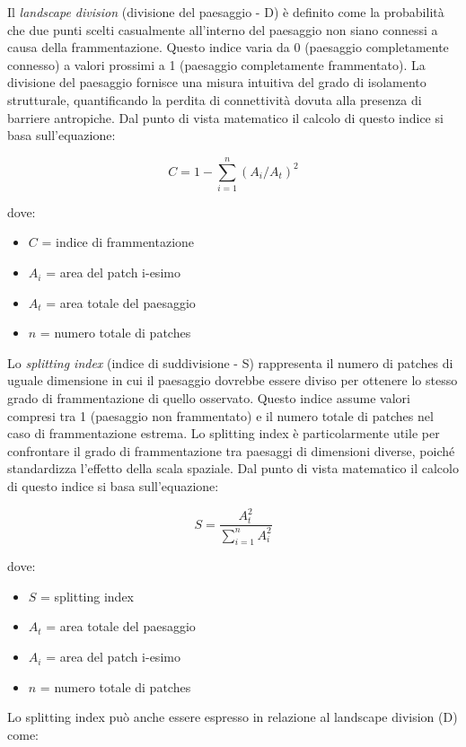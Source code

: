 \documentclass[
  a4paper,
]{book}
\providecommand{\tightlist}{%
  \setlength{\itemsep}{0pt}\setlength{\parskip}{0pt}}
\begin{document}
Il \emph{landscape division} (divisione del paesaggio - D) è definito come la probabilità che due punti scelti casualmente all'interno del paesaggio non siano connessi a causa della frammentazione.
Questo indice varia da 0 (paesaggio completamente connesso) a valori prossimi a 1 (paesaggio completamente frammentato).
La divisione del paesaggio fornisce una misura intuitiva del grado di isolamento strutturale, quantificando la perdita di connettività dovuta alla presenza di barriere antropiche.
Dal punto di vista matematico il calcolo di questo indice si basa sull'equazione:

\[C=1-\sum_{i=1}^{n}(A_i/A_t)^2\]

dove:

\begin{itemize}
\tightlist
\item
  \(C\) = indice di frammentazione
\item
  \(A_i\) = area del patch i-esimo
\item
  \(A_t\) = area totale del paesaggio
\item
  \(n\) = numero totale di patches
\end{itemize}

Lo \emph{splitting index} (indice di suddivisione - S) rappresenta il numero di patches di uguale dimensione in cui il paesaggio dovrebbe essere diviso per ottenere lo stesso grado di frammentazione di quello osservato.
Questo indice assume valori compresi tra 1 (paesaggio non frammentato) e il numero totale di patches nel caso di frammentazione estrema.
Lo splitting index è particolarmente utile per confrontare il grado di frammentazione tra paesaggi di dimensioni diverse, poiché standardizza l'effetto della scala spaziale.
Dal punto di vista matematico il calcolo di questo indice si basa sull'equazione:

\[S=\frac{A_{t}^{2}}{\sum_{i=1}^{n}A_i^2}\]

dove:

\begin{itemize}
\tightlist
\item
  \(S\) = splitting index
\item
  \(A_t\) = area totale del paesaggio
\item
  \(A_i\) = area del patch i-esimo
\item
  \(n\) = numero totale di patches
\end{itemize}

Lo splitting index può anche essere espresso in relazione al landscape division (D) come:
\end{document}
